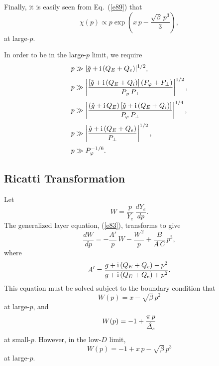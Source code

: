 \documentclass[titlepage=false,12pt]{article}
\begin{document}
Finally, it is easily seen from Eq.~(\ref{e89}) that
\begin{equation}
\chi(p) \propto  p\exp\left(x\,p - \frac{\sqrt{\beta}\,p^3}{3}\right),
\end{equation}
at large-$p$. 

In order to be in the large-$p$ limit, we require
\begin{align}
p&\gg |\hat{g}+{\rm i}\,(Q_E+Q_e)|^{1/2},\\[0.5ex]
p&\gg\left|\frac{[\hat{g}+{\rm i}\,(Q_E+Q_i)]\,(P_\varphi + P_\perp)}{P_\varphi\,P_\perp}\right|^{1/2},\\[0.5ex]
p&\gg \left|\frac{(\hat{g}+{\rm i}\,Q_E)\,[\hat{g}+{\rm i}\,(Q_E+Q_i)]}{P_\varphi\,P_\perp}\right|^{1/4},\\[0.5ex]
p&\gg \left|\frac{\hat{g}+{\rm i}\,(Q_E+Q_e)}{P_\perp}\right|^{1/2},\\[0.5ex]
p&\gg P_\varphi^{-1/6}.
\end{align} 

\subsection{Ricatti Transformation}
Let 
\begin{equation}
W= \frac{p}{Y_e}\,\frac{dY_e}{dp}.
\end{equation}
The generalized layer equation, (\ref{e83}), transforms to give
\begin{equation}\label{e72a}
\frac{dW}{dp} =- \frac{A'}{p}\,W -\frac{W^{\,2}}{p} + \frac{B}{A\,C}\,p^3,
\end{equation}
where
\begin{equation}
A' = \frac{g+{\rm i}\,(Q_E+Q_e)-p^2}{g+{\rm i}\,(Q_E+Q_e)+p^2}.
\end{equation}
This equation must be solved subject to the boundary condition that
\begin{equation}\label{e63a}
W(p) = x-\sqrt{\beta}\,p^2
\end{equation}
at large-$p$, and
\begin{equation}\label{e73a}
W (p)=-1+\frac{\pi\,p}{\hat{\mit\Delta}_s}
\end{equation}
at small-$p$. 
However, in the low-$D$ limit,
\begin{equation}\label{e63aa}
W(p) = -1 +x\,p-\sqrt{\beta}\,p^3
\end{equation}
at large-$p$. 
\end{document}
